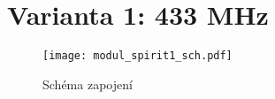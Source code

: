   \section{Varianta 1: 433 MHz}
    \begin{figure*}[ht!]
      \centering
      \texttt{[image: modul\_spirit1\_sch.pdf]}
      \caption{Schéma zapojení}
      \label{EXP001:fig_exp_sch434MHz}
    \end{figure*}
    
\printbibliography[heading=bibliography]
